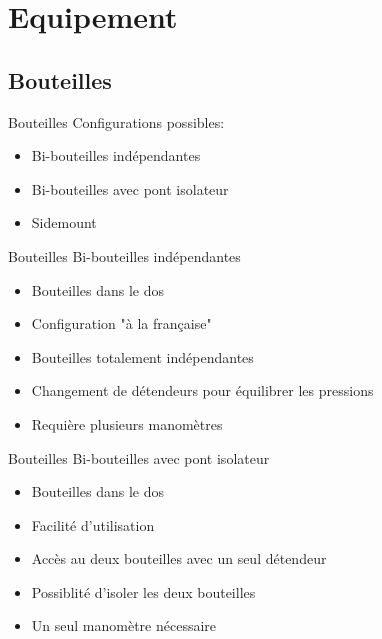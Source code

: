 
\section{Equipement}

\subsection{Bouteilles}

\begin{frame}{Bouteilles}
	Configurations possibles:
	\begin{itemize}
		\item Bi-bouteilles indépendantes
		\item Bi-bouteilles avec pont isolateur
		\item Sidemount
	\end{itemize}
\end{frame}

\begin{frame}{Bouteilles}  
	Bi-bouteilles indépendantes
	\begin{itemize}
		\item Bouteilles dans le dos
		\item Configuration "à la française"
		\item Bouteilles totalement indépendantes
		\item Changement de détendeurs pour équilibrer les pressions
		\item Requière plusieurs manomètres
	\end{itemize}
\end{frame}

\begin{frame}{Bouteilles}  
	Bi-bouteilles avec pont isolateur
	\begin{itemize}
		\item Bouteilles dans le dos
		\item Facilité d'utilisation
		\item Accès au deux bouteilles avec un seul détendeur
		\item Possiblité d'isoler les deux bouteilles
		\item Un seul manomètre nécessaire
	\end{itemize}
\end{frame}

